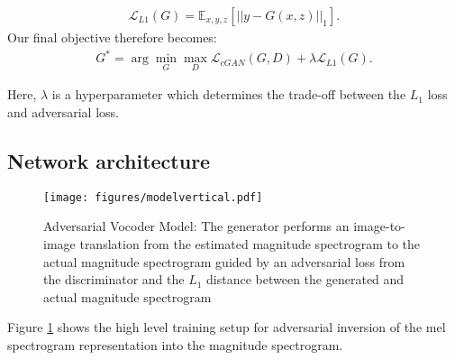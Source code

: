 \documentclass[a4paper]{article}
\begin{document}
\begin{align}
    \mathcal{L}_{L1}(G) = \mathbb{E}_{x,y,z}[{||y-G(x,z)||}_1].\label{L1_equation}
\end{align}
Our final objective therefore becomes:
\begin{align}
    G^*  = \arg\min_G\max_D \mathcal{L}_{\mathit{cGAN}}(G,D) + \lambda \mathcal{L}_{L1}(G).\label{full_objective}
\end{align}

Here, $\lambda$ is a hyperparameter which determines the trade-off between the $L_1$ loss and adversarial loss.


\subsection{Network architecture}

\begin{figure}[htbp]
    \centering
    \texttt{[image: figures/modelvertical.pdf]}
    \caption{Adversarial Vocoder Model: The generator performs an image-to-image translation from the estimated magnitude spectrogram to the actual magnitude spectrogram guided by an adversarial loss from the discriminator and the $L_1$ distance between the generated and actual magnitude spectrogram }
    \label{fig:model}
\end{figure}

Figure \ref{fig:model} shows the high level training setup for adversarial inversion of the mel spectrogram representation into the magnitude spectrogram.
\end{document}
